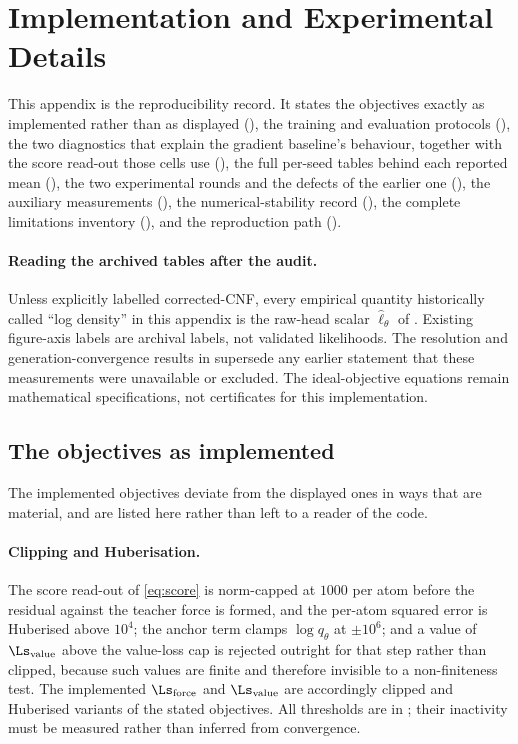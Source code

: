 \section{Implementation and Experimental Details}
\label{app:details}

This appendix is the reproducibility record. It states the objectives exactly as
implemented rather than as displayed (), the
training and evaluation protocols (), the
two diagnostics that explain the gradient baseline's behaviour, together with the
score read-out those cells use
(), the full per-seed tables behind each reported mean
(), the two experimental rounds and the defects of
the earlier one (), the auxiliary measurements
(), the numerical-stability record
(), the complete limitations inventory
(), and the reproduction path ().

\paragraph{Reading the archived tables after the audit.}
Unless explicitly labelled corrected-CNF, every empirical quantity historically called
``log density'' in this appendix is the raw-head scalar $\widehat\ell_\theta$ of
. Existing figure-axis labels are archival labels, not validated likelihoods.
The resolution and generation-convergence results in  supersede any earlier
statement that these measurements were unavailable or excluded. The ideal-objective equations
remain mathematical specifications, not certificates for this implementation.

\subsection{The objectives as implemented}
\label{app:asimplemented}

The implemented objectives deviate from the displayed ones in ways that are
material, and are listed here rather than left to a reader of the code.

\paragraph{Clipping and Huberisation.} The score read-out of \eqref{eq:score} is
norm-capped at $1000$ per atom before the residual against the teacher force is
formed, and the per-atom squared error is Huberised above $10^{4}$; the anchor term
clamps $\log q_\theta$ at $\pm 10^{6}$; and a value of $\Ls_{\mathrm{value}}$ above
the value-loss cap is rejected outright for that step rather than clipped, because
such values are finite and therefore invisible to a non-finiteness test. The
implemented $\Ls_{\mathrm{force}}$ and $\Ls_{\mathrm{value}}$ are accordingly
clipped and Huberised variants of the stated objectives. All thresholds are in
; their inactivity must be measured rather than inferred from convergence.

